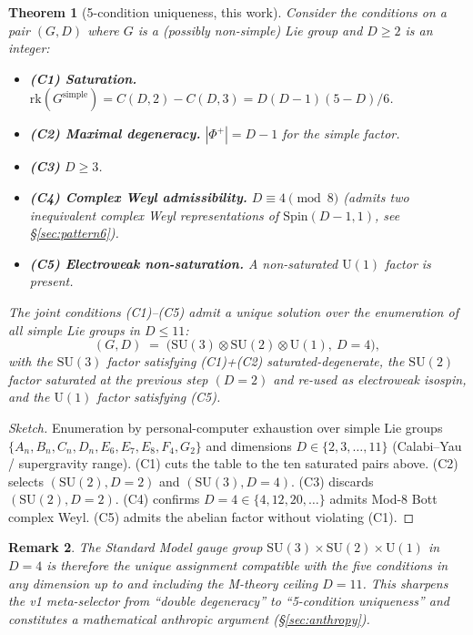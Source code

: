 \documentclass[11pt,a4paper]{article}
\newtheorem{theorem}{Theorem}[section]
\newtheorem{remark}[theorem]{Remark}
\newcommand{\SU}{\mathrm{SU}}
\newcommand{\Uone}{\mathrm{U}(1)}
\newcommand{\Spin}{\mathrm{Spin}}
\newcommand{\rk}{\mathrm{rk}}
\newcommand{\Phiplus}{\Phi^{+}}
\begin{document}
\begin{theorem}[5-condition uniqueness, this work]\label{thm:uniqueness}
Consider the conditions on a pair $(G, D)$ where $G$ is a (possibly non-simple) Lie group and $D \geq 2$ is an integer:
\begin{itemize}[leftmargin=*]
  \item \textbf{(C1) Saturation.} $\rk(G^{\mathrm{simple}}) = C(D, 2) - C(D, 3) = D(D-1)(5-D)/6$.
  \item \textbf{(C2) Maximal degeneracy.} $|\Phiplus| = D - 1$ for the simple factor.
  \item \textbf{(C3)} $D \geq 3$.
  \item \textbf{(C4) Complex Weyl admissibility.} $D \equiv 4 \pmod 8$ (admits two inequivalent complex Weyl representations of $\Spin(D-1, 1)$, see \S\ref{sec:pattern6}).
  \item \textbf{(C5) Electroweak non-saturation.} A non-saturated $\Uone$ factor is present.
\end{itemize}
The joint conditions \emph{(C1)--(C5)} admit a \emph{unique} solution over the enumeration of all simple Lie groups in $D \leq 11$:
\[
(G, D) \;=\; \bigl(\SU(3) \otimes \SU(2) \otimes \Uone,\ D = 4\bigr),
\]
with the $\SU(3)$ factor satisfying \emph{(C1)+(C2)} saturated-degenerate, the $\SU(2)$ factor saturated at the previous step $(D = 2)$ and re-used as electroweak isospin, and the $\Uone$ factor satisfying \emph{(C5)}.
\end{theorem}

\begin{proof}[Sketch]
Enumeration by personal-computer exhaustion over simple Lie groups $\{A_n, B_n, C_n, D_n, E_6, E_7, E_8, F_4, G_2\}$ and dimensions $D \in \{2, 3, \ldots, 11\}$ (Calabi--Yau / supergravity range). (C1) cuts the table to the ten saturated pairs above. (C2) selects $(\SU(2), D = 2)$ and $(\SU(3), D = 4)$. (C3) discards $(\SU(2), D = 2)$. (C4) confirms $D = 4 \in \{4, 12, 20, \ldots\}$ admits Mod-8 Bott complex Weyl. (C5) admits the abelian factor without violating (C1).
\end{proof}

\begin{remark}
The Standard Model gauge group $\SU(3) \times \SU(2) \times \Uone$ in $D = 4$ is therefore the \emph{unique} assignment compatible with the five conditions in any dimension up to and including the M-theory ceiling $D = 11$. This sharpens the v1 meta-selector from ``double degeneracy'' to ``5-condition uniqueness'' and constitutes a \emph{mathematical anthropic} argument (\S\ref{sec:anthropy}).
\end{remark}
\end{document}
